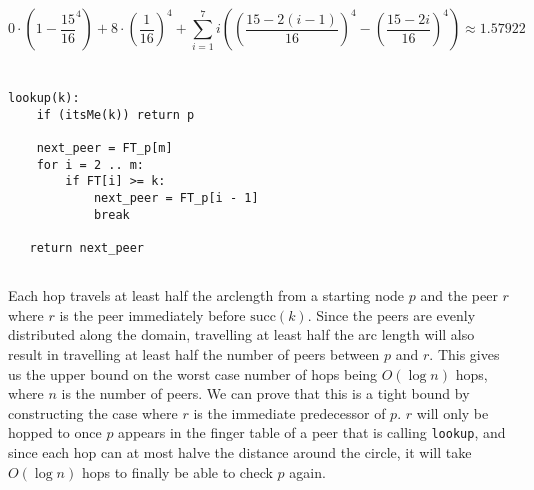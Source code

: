 \documentclass[12pt]{article}
\begin{document}
$$0\cdot(1 - \frac{15}{16}^4) + 8\cdot(\frac{1}{16})^4 + \sum_{i = 1}^7 i \left(\left(\frac{15 - 2(i - 1)}{16}\right)^4
- \left(\frac{15 - 2i}{16}\right)^4\right) \approx 1.57922$$


\section{}
\subsection{}
\begin{verbatim}
lookup(k):
    if (itsMe(k)) return p

    next_peer = FT_p[m]
    for i = 2 .. m:
        if FT[i] >= k:
            next_peer = FT_p[i - 1]
            break

   return next_peer 
\end{verbatim}


\subsection{}
Each hop travels at least half the arclength from a starting node $p$ and the
peer $r$ where $r$ is the peer immediately before $\text{succ}(k)$.  Since the
peers are evenly distributed along the domain, travelling at least half the arc
length will also result in travelling at least half the number of peers between
$p$ and $r$.  This gives us the upper bound on the worst case number of hops
being $O(\log n)$ hops, where $n$ is the number of peers.  We can prove that
this is a tight bound by constructing the case where $r$ is the immediate
predecessor of $p$.  $r$ will only be hopped to once $p$ appears in the finger
table of a peer that is calling \texttt{lookup}, and since each hop can at most
halve the distance around the circle, it will take $O(\log n)$ hops to finally
be able to check $p$ again.
\end{document}
